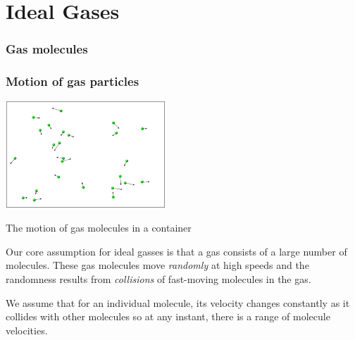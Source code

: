 \chapter{Ideal Gases}

\subsection{Gas molecules}


\subsection{Motion of gas particles} \label{s-gas-intro}

\begin{marginfigure}
	\centering
	
	\vspace*{-20pt}
	
	\includegraphics[width=6cm]{gas-random-motion}
		
	\caption{The motion of gas molecules in a container}
	
\end{marginfigure}

Our core assumption for ideal gasses is that a gas consists of a large number of molecules. These gas molecules move \emph{randomly} at high speeds and the  randomness results from \emph{collisions} of fast-moving molecules in the gas.

We assume that for an individual molecule, its velocity changes constantly as it collides with other molecules so at any instant, there is a range of molecule velocities.  

